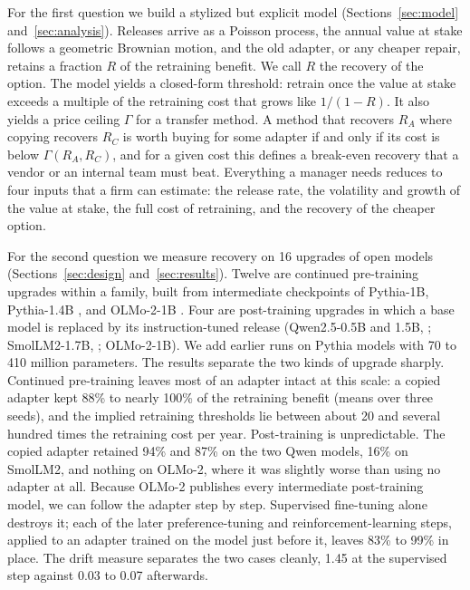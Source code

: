 \documentclass[ijds,blindrev]{informs4}
\begin{document}
For the first question we build a stylized but explicit model (Sections~\ref{sec:model} and~\ref{sec:analysis}). Releases arrive as a Poisson process, the annual value at stake follows a geometric Brownian motion, and the old adapter, or any cheaper repair, retains a fraction $R$ of the retraining benefit. We call $R$ the recovery of the option. The model yields a closed-form threshold: retrain once the value at stake exceeds a multiple of the retraining cost that grows like $1/(1-R)$. It also yields a price ceiling $\Gamma$ for a transfer method. A method that recovers $R_A$ where copying recovers $R_C$ is worth buying for some adapter if and only if its cost is below $\Gamma(R_A,R_C)$, and for a given cost this defines a break-even recovery that a vendor or an internal team must beat. Everything a manager needs reduces to four inputs that a firm can estimate: the release rate, the volatility and growth of the value at stake, the full cost of retraining, and the recovery of the cheaper option.

For the second question we measure recovery on 16 upgrades of open models (Sections~\ref{sec:design} and~\ref{sec:results}). Twelve are continued pre-training upgrades within a family, built from intermediate checkpoints of Pythia-1B, Pythia-1.4B \citep{biderman2023pythia}, and OLMo-2-1B \citep{olmo2024olmo2}. Four are post-training upgrades in which a base model is replaced by its instruction-tuned release (Qwen2.5-0.5B and 1.5B, \citealt{qwen2024qwen25}; SmolLM2-1.7B, \citealt{allal2025smollm2}; OLMo-2-1B). We add earlier runs on Pythia models with 70 to 410 million parameters. The results separate the two kinds of upgrade sharply. Continued pre-training leaves most of an adapter intact at this scale: a copied adapter kept 88\% to nearly 100\% of the retraining benefit (means over three seeds), and the implied retraining thresholds lie between about 20 and several hundred times the retraining cost per year. Post-training is unpredictable. The copied adapter retained 94\% and 87\% on the two Qwen models, 16\% on SmolLM2, and nothing on OLMo-2, where it was slightly worse than using no adapter at all. Because OLMo-2 publishes every intermediate post-training model, we can follow the adapter step by step. Supervised fine-tuning alone destroys it; each of the later preference-tuning and reinforcement-learning steps, applied to an adapter trained on the model just before it, leaves 83\% to 99\% in place. The drift measure separates the two cases cleanly, 1.45 at the supervised step against 0.03 to 0.07 afterwards.
\end{document}
